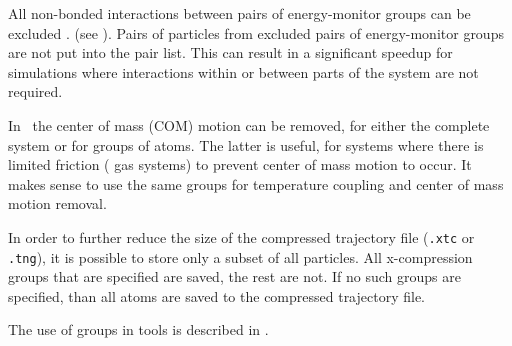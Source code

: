 \begin{description}
All non-bonded interactions between pairs of energy-monitor groups can
be excluded
{.}
{(see ).}
Pairs of particles from excluded pairs of energy-monitor groups
are not put into the pair list.
This can result in a significant speedup
for simulations where interactions within or between parts of the system
are not required.

\item[\swapindex{center of mass}{group}\index{removing COM motion}]
In \gromacs\ the center of mass (COM) motion can be removed, for
either the complete system or for groups of atoms. The latter is
useful, {\eg} for systems where there is limited friction ({\eg} gas
systems) to prevent center of mass motion to occur. It makes sense to
use the same groups for temperature coupling and center of mass motion
removal.

\item[\swapindex{Compressed position output}{group}]

In order to further reduce the size of the compressed trajectory file
({\tt .xtc{}} or {\tt .tng{}}), it is possible
to store only a subset of all particles. All x-compression groups that
are specified are saved, the rest are not. If no such groups are
specified, than all atoms are saved to the compressed trajectory file.

\end{description}
The use of groups in {\gromacs} tools is described in
.

